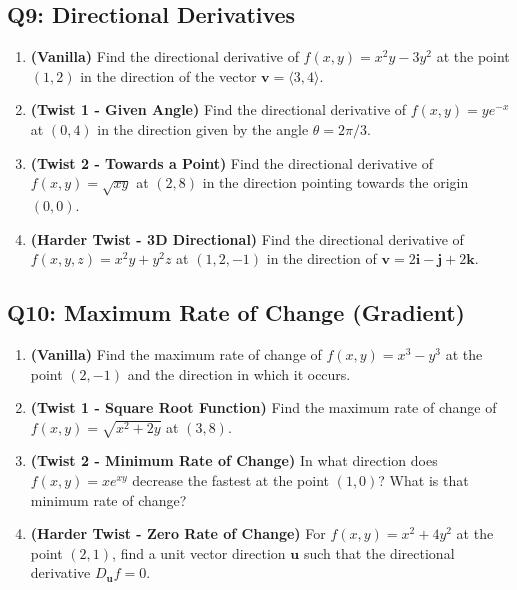 \documentclass[11pt]{article}
\begin{document}
\subsection{Q9: Directional Derivatives}
\begin{enumerate}[label=\textbf{9\alph*.}]
    \item \textbf{(Vanilla)} Find the directional derivative of $f(x,y) = x^2y - 3y^2$ at the point $(1, 2)$ in the direction of the vector $\mathbf{v} = \langle 3, 4 \rangle$.
    \item \textbf{(Twist 1 - Given Angle)} Find the directional derivative of $f(x,y) = y e^{-x}$ at $(0, 4)$ in the direction given by the angle $\theta = 2\pi/3$.
    \item \textbf{(Twist 2 - Towards a Point)} Find the directional derivative of $f(x,y) = \sqrt{xy}$ at $(2, 8)$ in the direction pointing towards the origin $(0,0)$.
    \item \textbf{(Harder Twist - 3D Directional)} Find the directional derivative of $f(x,y,z) = x^2y + y^2z$ at $(1, 2, -1)$ in the direction of $\mathbf{v} = 2\mathbf{i} - \mathbf{j} + 2\mathbf{k}$.
\end{enumerate}

\subsection{Q10: Maximum Rate of Change (Gradient)}
\begin{enumerate}[label=\textbf{10\alph*.}]
    \item \textbf{(Vanilla)} Find the maximum rate of change of $f(x,y) = x^3 - y^3$ at the point $(2, -1)$ and the direction in which it occurs.
    \item \textbf{(Twist 1 - Square Root Function)} Find the maximum rate of change of $f(x,y) = \sqrt{x^2 + 2y}$ at $(3, 8)$.
    \item \textbf{(Twist 2 - Minimum Rate of Change)} In what direction does $f(x,y) = x e^{xy}$ decrease the fastest at the point $(1, 0)$? What is that minimum rate of change?
    \item \textbf{(Harder Twist - Zero Rate of Change)} For $f(x,y) = x^2 + 4y^2$ at the point $(2, 1)$, find a unit vector direction $\mathbf{u}$ such that the directional derivative $D_{\mathbf{u}}f = 0$.
\end{enumerate}
\end{document}
